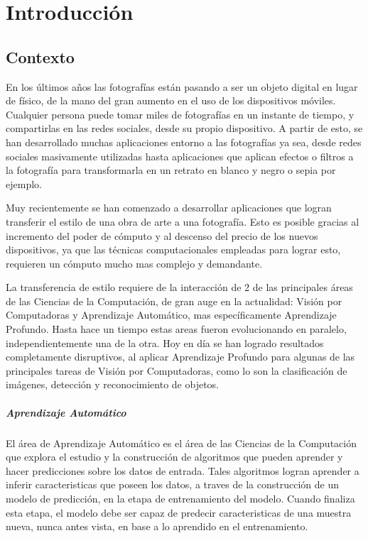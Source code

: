 \documentclass[a4paper,11pt,spanish]{book}
\begin{document}
\tableofcontents

\chapter{Introducción}
  \section {Contexto}
    En los últimos años las fotografías están pasando a ser un objeto digital en lugar de físico, de la mano del gran aumento en el uso de los dispositivos móviles.
    Cualquier persona puede tomar miles de fotografías en un instante de tiempo, y compartirlas en las redes sociales, desde su propio dispositivo.
    A partir de esto, se han desarrollado muchas aplicaciones entorno a las fotografías ya sea, desde redes sociales masivamente utilizadas hasta aplicaciones que aplican efectos
    o filtros a la fotografía para transformarla en un retrato en blanco y negro o sepia por ejemplo.

    Muy recientemente se han comenzado a desarrollar aplicaciones que logran transferir el estilo de una obra de arte a una fotografía. Esto es posible gracias al incremento
    del poder de cómputo y al descenso del precio de los nuevos dispositivos, ya que las técnicas computacionales empleadas para lograr esto, requieren un cómputo mucho mas complejo
    y demandante.

    La transferencia de estilo requiere de la interacción de 2 de las principales áreas de las Ciencias de la Computación, de gran auge en la actualidad: Visión por Computadoras y Aprendizaje Automático,
    mas específicamente Aprendizaje Profundo.
    Hasta hace un tiempo estas areas fueron evolucionando en paralelo, independientemente una de la otra. Hoy en día se han logrado resultados completamente disruptivos, al aplicar
    Aprendizaje Profundo para algunas de las principales tareas de Visión por Computadoras, como lo son la clasificación de imágenes, detección y reconocimiento de objetos.

    \paragraph{Aprendizaje Automático}
      El área de Aprendizaje Automático es el área de las Ciencias de la Computación que explora el estudio y la construcción de algoritmos que pueden aprender y hacer predicciones
      sobre los datos de entrada.
      Tales algoritmos logran aprender a inferir caracteristicas que poseen los datos, a traves de la construcción de un modelo de predicción, en la etapa de entrenamiento del modelo.
      Cuando finaliza esta etapa, el modelo debe ser capaz de predecir caracteristicas de una muestra nueva, nunca antes vista, en base a lo aprendido en el entrenamiento.
\end{document}
